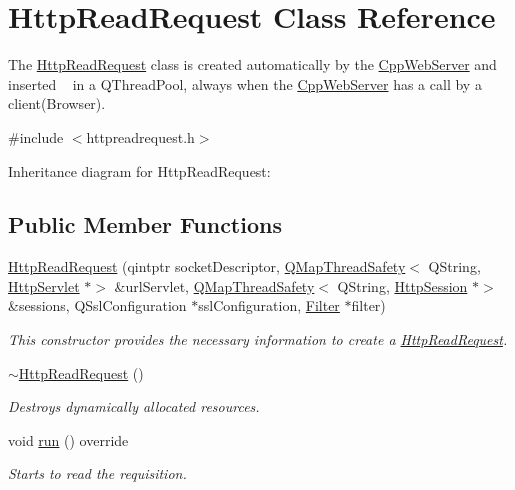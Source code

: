 \hypertarget{class_http_read_request}{}\section{Http\+Read\+Request Class Reference}
\label{class_http_read_request}


The \mbox{\hyperlink{class_http_read_request}{Http\+Read\+Request}} class is created automatically by the \mbox{\hyperlink{class_cpp_web_server}{Cpp\+Web\+Server}} and inserted ~\newline
 in a Q\+Thread\+Pool, always when the \mbox{\hyperlink{class_cpp_web_server}{Cpp\+Web\+Server}} has a call by a client(\+Browser).  




{\ttfamily \#include $<$httpreadrequest.\+h$>$}



Inheritance diagram for Http\+Read\+Request\+:
\subsection*{Public Member Functions}
\begin{DoxyCompactItemize}
\item 
\mbox{\hyperlink{class_http_read_request_ae585e99b43ee991c3b4884a1852eeb82}{Http\+Read\+Request}} (qintptr socket\+Descriptor, \mbox{\hyperlink{class_q_map_thread_safety}{Q\+Map\+Thread\+Safety}}$<$ Q\+String, \mbox{\hyperlink{class_http_servlet}{Http\+Servlet}} $\ast$$>$ \&url\+Servlet, \mbox{\hyperlink{class_q_map_thread_safety}{Q\+Map\+Thread\+Safety}}$<$ Q\+String, \mbox{\hyperlink{class_http_session}{Http\+Session}} $\ast$$>$ \&sessions, Q\+Ssl\+Configuration $\ast$ssl\+Configuration, \mbox{\hyperlink{class_filter}{Filter}} $\ast$filter)
\begin{DoxyCompactList}\small\item\em This constructor provides the necessary information to create a \mbox{\hyperlink{class_http_read_request}{Http\+Read\+Request}}. \end{DoxyCompactList}\item 
\mbox{\label{class_http_read_request_a876bcf62d5428d982c5af6f35e59b963}} 
\mbox{\hyperlink{class_http_read_request_a876bcf62d5428d982c5af6f35e59b963}{$\sim$\+Http\+Read\+Request}} ()
\begin{DoxyCompactList}\small\item\em Destroys dynamically allocated resources. \end{DoxyCompactList}\item 
\mbox{\label{class_http_read_request_a8db91de80ce8e83a3b89758a22eec5c3}} 
void \mbox{\hyperlink{class_http_read_request_a8db91de80ce8e83a3b89758a22eec5c3}{run}} () override
\begin{DoxyCompactList}\small\item\em Starts to read the requisition. \end{DoxyCompactList}\end{DoxyCompactItemize}


